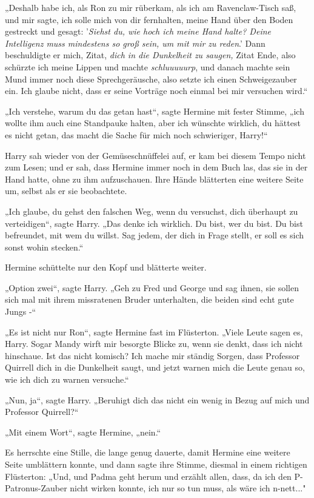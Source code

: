{„Deshalb habe ich, als Ron zu mir rüberkam, als ich am Ravenclaw-Tisch saß, und mir sagte, ich solle mich von dir fernhalten, meine Hand über den Boden gestreckt und gesagt: '\emph{Siehst du, wie hoch ich meine Hand halte? Deine Intelligenz muss mindestens so groß sein, um mit mir zu reden}.' Dann beschuldigte er mich, Zitat, \emph{dich in die Dunkelheit zu saugen,} Zitat Ende, also schürzte ich meine Lippen und machte \emph{schluuuuurp}, und danach machte sein Mund immer noch diese Sprechgeräusche, also setzte ich einen Schweigezauber ein. Ich glaube nicht, dass er seine Vorträge noch einmal bei mir versuchen wird.“

„Ich verstehe, warum du das getan hast“, sagte Hermine mit fester Stimme, „ich wollte ihm auch eine Standpauke halten, aber ich wünschte wirklich, du hättest es nicht getan, das macht die Sache für mich noch schwieriger, Harry!“

Harry sah wieder von der Gemüseschnüffelei auf, er kam bei diesem Tempo nicht zum Lesen; und er sah, dass Hermine immer noch in dem Buch las, das sie in der Hand hatte, ohne zu ihm aufzuschauen. Ihre Hände blätterten eine weitere Seite um, selbst als er sie beobachtete.

„Ich glaube, du gehst den falschen Weg, wenn du versuchst, dich überhaupt zu verteidigen“, sagte Harry. „Das denke ich wirklich. Du bist, wer du bist. Du bist befreundet, mit wem du willst. Sag jedem, der dich in Frage stellt, er soll es sich sonst wohin stecken.“

Hermine schüttelte nur den Kopf und blätterte weiter.

„Option zwei“, sagte Harry. „Geh zu Fred und George und sag ihnen, sie sollen sich mal mit ihrem missratenen Bruder unterhalten, die beiden sind echt gute Jungs -“

„Es ist nicht nur Ron“, sagte Hermine fast im Flüsterton. „Viele Leute sagen es, Harry. Sogar Mandy wirft mir besorgte Blicke zu, wenn sie denkt, dass ich nicht hinschaue. Ist das nicht komisch? Ich mache mir ständig Sorgen, dass Professor Quirrell dich in die Dunkelheit saugt, und jetzt warnen mich die Leute genau so, wie ich dich zu warnen versuche.“

„Nun, ja“, sagte Harry. „Beruhigt dich das nicht ein wenig in Bezug auf mich und Professor Quirrell?“

„Mit einem Wort“, sagte Hermine, „nein.“

Es herrschte eine Stille, die lange genug dauerte, damit Hermine eine weitere Seite umblättern konnte, und dann sagte ihre Stimme, diesmal in einem richtigen Flüsterton: „Und, und Padma geht herum und erzählt allen, dass, da ich den P-Patronus-Zauber nicht wirken konnte, ich nur so tun muss, als wäre ich n-nett..."

}
